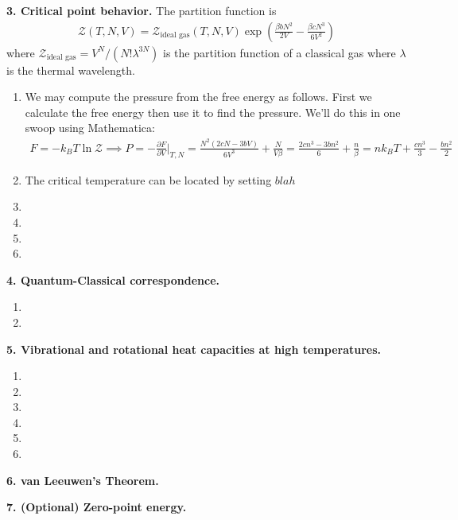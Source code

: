 \documentclass{article}
\theoremstyle{definition}
\newcommand{\p}{\partial}
\newcommand{\be}{\beta}
\newcommand{\f}[2]{\frac{#1}{#2}}
\newcommand{\lp}{\left(}
\newcommand{\rp}{\right)}
\begin{document}
\noindent \textbf{3. Critical point behavior.} The partition function is 
\begin{align*}
\mathcal{Z}(T,N,V) = \mathcal{Z}_\text{ideal gas}(T,N,V) \exp\lp \f{\be b N^2}{2V} - \f{\be c N^3}{6V^2} \rp
\end{align*}
where $\mathcal{Z}_\text{ideal gas} = V^N/(N! \lambda^{3N})$ is the partition function of a classical gas where $\lambda$ is the thermal wavelength. 

\begin{enumerate}[label=(\alph*)]
	\item We may compute the pressure from the free energy as follows. First we calculate the free energy then use it to find the pressure. We'll do this in one swoop using Mathematica:
	\begin{align*}
	F = -k_BT \ln \mathcal{Z} \implies \boxed{P} = -\f{\p F}{\p V}\bigg\vert_{T,N} = {\f{N^2(2cN - 3bV)}{6V^3} + \f{N}{V\be}} = \f{2cn^3 - 3bn^2}{6} + \f{n}{\be} = \boxed{nk_BT + \f{cn^3}{3} - \f{b n^2}{2}}
	\end{align*}
	
	
	\item The critical temperature can be located by setting $blah$
	\item 
	\item 
	\item 
	\item
\end{enumerate}

\noindent \textbf{4. Quantum-Classical correspondence.}

\begin{enumerate}[label=(\alph*)]
	\item 
	\item 
\end{enumerate}

\noindent \textbf{5. Vibrational and rotational heat capacities at high temperatures.}

\begin{enumerate}[label=(\alph*)]
	\item 
	\item 
	\item 
	\item 
	\item 
	\item 
\end{enumerate}

\noindent \textbf{6. van Leeuwen's Theorem.}


\noindent \textbf{7. (Optional) Zero-point energy.}
\end{document}
